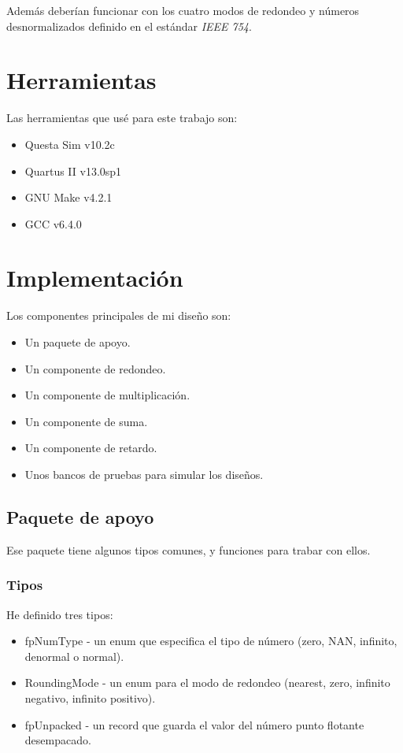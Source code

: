 \documentclass[a4paper]{article}
\begin{document}
Además deberían funcionar con los cuatro modos de redondeo y números desnormalizados definido en el estándar \textit{IEEE 754}.

\section{Herramientas}

Las herramientas que usé para este trabajo son:
\begin{itemize}[noitemsep]
\item Questa Sim v10.2c
\item Quartus II v13.0sp1
\item GNU Make v4.2.1
\item GCC v6.4.0
\end{itemize}

\section{Implementación}

Los componentes principales de mi diseño son:
\begin{itemize}[noitemsep]
\item Un paquete de apoyo.
\item Un componente de redondeo.
\item Un componente de multiplicación.
\item Un componente de suma.
\item Un componente de retardo.
\item Unos bancos de pruebas para simular los diseños.
\end{itemize}

\subsection{Paquete de apoyo}

Ese paquete tiene algunos tipos comunes, y funciones para trabar con ellos.

\subsubsection{Tipos}

He definido tres tipos:
\begin{itemize}[noitemsep]
\item fpNumType - un enum que especifica el tipo de número (zero, NAN, infinito, denormal o normal).
\item RoundingMode - un enum para el modo de redondeo (nearest, zero, infinito negativo, infinito positivo).
\item fpUnpacked - un record que guarda el valor del número punto flotante desempacado.
\end{itemize}
\end{document}
